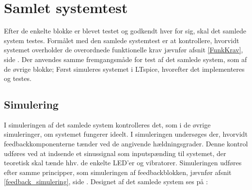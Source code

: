 \section{Samlet systemtest}
Efter de enkelte blokke er blevet testet og godkendt hver for sig, skal det samlede system testes. Formålet med den samlede systemtest er at kontrollere, hvorvidt systemet overholder de overordnede funktionelle krav jævnfør afsnit \ref{FunkKrav}, side \pageref{FunkKrav}. Der anvendes samme fremgangsmåde for test af det samlede system, som af de øvrige blokke; Først simuleres systemet i LTspice, hvorefter det implementeres og testes.

\subsection{Simulering}
I simuleringen af det samlede system kontrolleres det, som i de øvrige simuleringer, om systemet fungerer ideelt. I simuleringen undersøges der, hvorvidt feedbackkomponenterne tænder ved de angivende hældningsgrader. Denne kontrol udføres ved at indsende et sinussignal som inputspænding til systemet, der teoretisk skal tænde hhv. de enkelte LED'er og vibratorer. Simuleringen udføres efter samme principper, som simuleringen af feedbackblokken, jævnfør afsnit \ref{feedback_simulering}, side \pageref{feedback_simulering}. Designet af det samlede system ses på :
